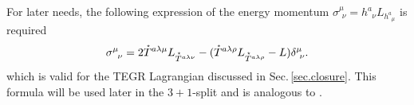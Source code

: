 \documentclass[
10pt, %
a4paper, %
oneside, %
twocolumn,
headinclude,footinclude, %
BCOR5mm, %
]{scrartcl}
\newcommand{\tetrsymbol}{h}
\newcommand{\tetr}[2]{\tetrsymbol^{#1}_{\phantom{#1}#2}}
\newcommand{\Laghodge}{L}%
\newcommand{\EMmat}[2]{\sigma^{#1}_{\ \,#2}}
\newcommand{\HDT}[1]{\accentset{\star}{T}^{#1}}
\newcommand{\Tscal}{\mathcal{T}}		%
\begin{document}
	
	For later needs, the following expression of the energy momentum $ \EMmat{\mu}{\nu} =
	\tetr{a}{\nu} \Laghodge_{\tetr{a}{\mu}} $ is required
	\begin{equation}\label{eqn.TEGR.vacuum}
		\EMmat{\mu}{\nu} 
		= 
		2 \HDT{a\lambda\mu}\Laghodge_{\HDT{a\lambda\nu}} - 
		(\HDT{a\lambda\rho}\Laghodge_{\HDT{a\lambda\rho}} - \Laghodge ) 
		\delta^\mu_{\ \nu}.
	\end{equation}
	which is valid for the TEGR Lagrangian discussed in Sec.\,\ref{sec.closure}. 
	This formula will be used later in the $ 3+1 $-split and is analogous to
	\cite[Eq.(10.13)]{AldrovandiPereiraBook}. 
	
\end{document}

